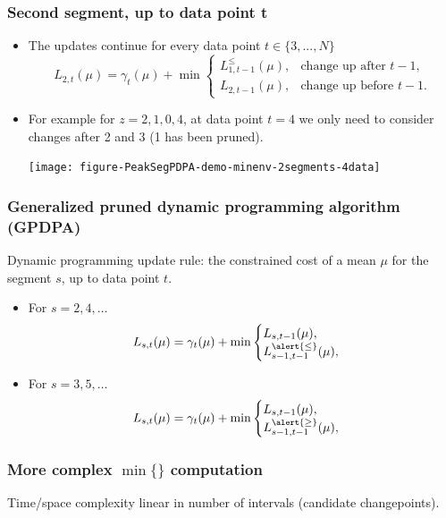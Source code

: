 \documentclass{beamer}
\begin{document}
\begin{frame}
  \frametitle{Second segment, up to data point t}
  \begin{itemize}
  \item The updates continue for every data point $t\in\{3, ..., N\}$
    \begin{equation*}
      L_{2,t}(\mu) =  \gamma_t(\mu) + \min
      \begin{cases}
        L_{1,t-1}^{\leq}(\mu), & \text{change up after $t-1$,}\\
        L_{2,t-1}(\mu), & \text{change up before $t-1$.}
      \end{cases}
    \end{equation*}
  \item For example for $z = 2, 1, 0, 4$, at data point $t=4$
    we only need to consider changes after 2 and 3 (1 has been
    pruned).
    \begin{center}
      \texttt{[image: figure-PeakSegPDPA-demo-minenv-2segments-4data]}
    \end{center}
  \end{itemize}
\end{frame}


\begin{frame}
  \frametitle{Generalized pruned dynamic programming algorithm (GPDPA)}
  Dynamic programming update rule: the constrained cost of a
  mean $\mu$ for the segment $s$, up to data point $t$.
  \begin{itemize}
  \item For $s=2, 4, \dots$
    \begin{equation*}
      L_{s,t}(\mu) = \gamma_t(\mu) + \min
      \begin{cases}
        L_{s,t-1}(\mu),\\
        L_{s-1,t-1}^{\alert{\leq}}(\mu),
      \end{cases}
    \end{equation*}
  \item For $s=3, 5, \dots$
    \begin{equation*}
      L_{s,t}(\mu) = \gamma_t(\mu) + \min
      \begin{cases}
        L_{s,t-1}(\mu),\\
        L_{s-1,t-1}^{\alert{\geq}}(\mu),
      \end{cases}
    \end{equation*}
  \end{itemize}
\end{frame}

\begin{frame}
  \frametitle{More complex $\min\{\}$ computation}
  Time/space complexity linear in number of intervals (candidate changepoints).
  \begin{minipage}[t]{\linewidth}
  \hskip -1cm
   
  \end{minipage}
\end{frame}
\end{document}
